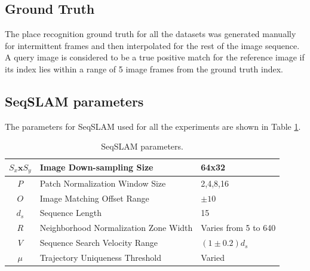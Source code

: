 \documentclass[letterpaper, 10 pt, conference]{ieeeconf}  %
\begin{document}
\subsection{Ground Truth}
The place recognition ground truth for all the datasets was generated manually for intermittent frames and then interpolated for the rest of the image sequence. A query image is considered to be a true positive match for the reference image if its index lies within a range of 5 image frames from the ground truth index.

\subsection{SeqSLAM parameters}
The parameters for SeqSLAM used for all the experiments are shown in Table \ref{table:seqSLAMParams}.

\begin{table}[!h]
	\caption{SeqSLAM parameters.}
	\begin{tabular}{|c|p{4cm}|p{2.5cm}|}
		\hline
		$S_x\mathbf{x}S_y$ & Image Down-sampling Size & 64x32 \\
		\hline
		$P$ & Patch Normalization Window Size & {2,4,8,16} \\
		\hline
		$O$ & Image Matching Offset Range & $\pm10$ \\
		\hline
		$d_s$ & Sequence Length & 15 \\
		\hline
		$R$ & Neighborhood Normalization Zone Width & Varies from 5 to 640 \\
		\hline
		$V$ & Sequence Search Velocity Range & $(1\pm0.2)d_s$ \\
		\hline
		$\mu$ & Trajectory Uniqueness Threshold & Varied \\
		\hline
	\end{tabular}
	\label{table:seqSLAMParams}
\end{table}
\end{document}
